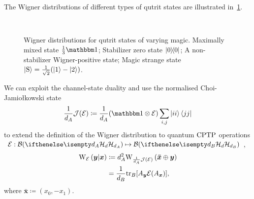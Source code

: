\documentclass[pra,
aps,
twocolumn,
superscriptaddress,
groupedaddress,
nofootinbib,
reprint
]{revtex4-1}
\begin{document}
The Wigner distributions of different types of qutrit states are illustrated in~\cref{fig:wstate_examples}.
\begin{figure}%
    \centering
    \hspace{8pt}%
    \\
    \hspace{8pt}%
    \caption{Wigner distributions for qutrit states of varying magic. 
     Maximally mixed state $\frac{1}{3}\id$;  Stabilizer zero state $\ketbra{0}{0}$;  A non-stabilizer Wigner-positive state;  Magic strange state $\ket{{\rm{S}}} = \frac{1}{\sqrt{2}}(\ket{1} - \ket{2})$.
    }%
    \label{fig:wstate_examples}
\end{figure}

We can exploit the channel-state duality and use the normalised Choi-Jamio\l{}kowski state 
\begin{equation}\label{eq:cj}
    \frac{1}{d_A}\J(\E) \coloneqq \frac{1}{d_A}(\id \otimes \E) \sum_{i,j} \ket{ii}\bra{jj}
\end{equation}
to extend the definition of the Wigner distribution to quantum ${\rm{CPTP}}$ operations $\E: \cal{B}(\hd[d_A]) \mapsto \cal{B}(\hd[d_B])$, 
\begin{align}\label{eq:woperation}
    \W[\bmy|\bmx]{\E} 
    &\coloneqq d_A^2 \W[\bm{\bar x} \oplus \bmy]{\frac{1}{d_A}\J(\E)} \\
    &= \frac{1}{d_B} \tr_B[A_{\bmy} \E(A_{\bmx})],
\end{align}
where $\bm{\bar x} \coloneqq (x_0, -x_1)$.
\end{document}
